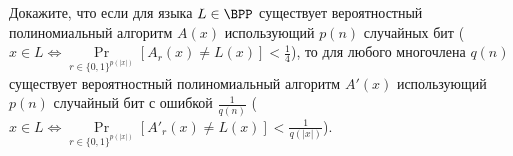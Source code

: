 Докажите, что если для языка $L \in \BPP$ существует вероятностный полиномиальный алгоритм $A(x)$ использующий $p(n)$
случайных бит ($x \in L \Leftrightarrow \Pr\limits_{r \in \{0, 1\}^{p(|x|)}}[A_r(x) \neq L(x)] < \frac{1}{4}$), то для любого
многочлена $q(n)$ существует вероятностный полиномиальный алгоритм $A'(x)$ использующий $p(n)$ случайный бит с ошибкой
$\frac{1}{q(n)}$ ($x \in L \Leftrightarrow \Pr\limits_{r \in \{0, 1\}^{p(|x|)}}[A'_r(x) \neq L(x)] < \frac{1}{q(|x|)}$).